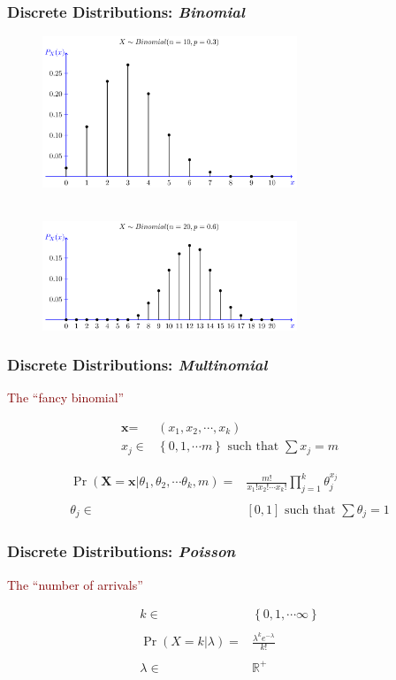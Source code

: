 \documentclass[xcolor={dvipsnames}]{beamer}
\begin{document}
\frame
{
 \frametitle{Discrete Distributions: \emph{Binomial} }
 
\begin{figure}
\centering
\includegraphics[width=3in]{stuff/binomial1.png}\\${}$

\includegraphics[width=3in]{stuff/binomial2.png} 
\end{figure}
}

\frame
{
 \frametitle{Discrete Distributions: \emph{Multinomial} } 

\Large
 
\textcolor{Maroon}{The ``fancy binomial''}

\large
\begin{align*}
\textbf{x} = {} &(x_1, x_2,\cdots,x_k) \\
x_j \in {} &\left\{0,1, \cdots m \right\}  \text{ such that } \sum x_j  = m 
\end{align*}

\Large

\begin{align*}
\Pr(\textbf{X}=\textbf{x}|\theta_1, \theta_2,\cdots \theta_k, m) 
= {} &\frac{m!}{x_1!x_2!\cdots x_k!}  \prod_{j=1}^k \theta_j^{x_j} \\\\
\theta_j \in {} & \left[0,1\right] \text{ such that } \sum \theta_j  = 1 
\end{align*}


}


\frame
{
 \frametitle{Discrete Distributions: \emph{Poisson}} %
 
 \Large

\textcolor{Maroon}{The ``number of arrivals''}

 \LARGE

\begin{align*}
k \in {} & \left\{0,1,\cdots \infty \right\} \\\\
\Pr(X=k|\lambda) = {} &\frac{\lambda^k e^{-\lambda}}{k!}\\\\
\lambda \in {} & \mathbb{R}^+
\end{align*}

}
\end{document}

